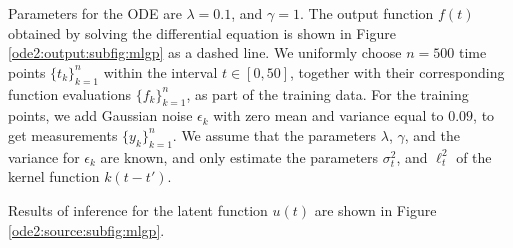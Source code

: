 \documentclass[journal]{IEEEtran}
\begin{document}
Parameters for the ODE are $\lambda = 0.1$, and $\gamma = 1$. The output function $f(t)$ obtained by solving the
differential equation is shown in Figure \ref{ode2:output:subfig:mlgp} as a dashed line. 
We uniformly choose $n=500$ time points $\{t_k\}_{k=1}^n$ within the interval $t\in [0,50]$, together with their
corresponding function evaluations $\{f_k\}_{k=1}^n$, as part of the training data. For the training points, we add Gaussian noise
$\epsilon_k$ with zero mean and variance equal to $0.09$, to get
measurements $\{y_k\}_{k=1}^n$. We assume that the parameters
$\lambda$, $\gamma$, and the variance for $\epsilon_k$ are known, and
only estimate the parameters $\sigma_t^2$,
and $\ell^2_t$ of the kernel function $k(t-t')$.

Results of inference for the latent function $u(t)$ are shown in Figure \ref{ode2:source:subfig:mlgp}.
\end{document}
